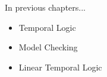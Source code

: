 
\begin{frame}{In previous chapters...}
  
  \begin{itemize}

    \item{ Temporal Logic}

    \item{Model Checking}

    \item{Linear Temporal Logic}

  \end{itemize}

\end{frame}